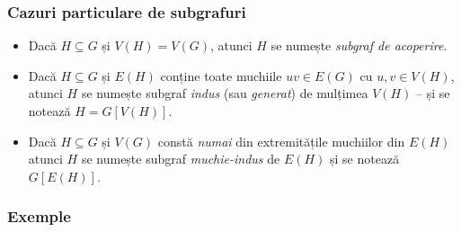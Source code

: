 \begin{frame}
  \frametitle{Cazuri particulare de subgrafuri}

\begin{itemize}
 \item Dacă $H\subseteq G$ și $V(H)=V(G)$, atunci $H$ se numește 
  \emph{subgraf de acoperire}.\pause
 \item Dacă $H\subseteq G$ și $E(H)$ conține toate muchiile $uv\in E(G)$ cu 
  $u,v\in V(H)$, atunci $H$ se numește subgraf \emph{indus}%
  (sau \emph{generat}) de mulțimea $V(H)$ -- și se notează $H=G[V(H)]$.\pause

 \item Dacă $H\subseteq G$ și $V(G)$ constă \emph{numai} din extremitățile 
  muchiilor din $E(H)$ atunci $H$ se numește subgraf \emph{muchie-indus} 
  de $E(H)$ și se notează $G[E(H)]$.
\end{itemize}

\end{frame}

\begin{frame}
  \frametitle{Exemple}

\begin{figure}
\centering%
\end{figure}

\end{frame}

